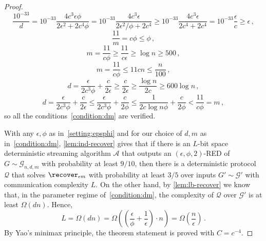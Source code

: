 \begin{proof}
\begin{equation*}
	\frac{10^{-33}}{d} = 10^{-33}\frac{4c^3\epsilon\phi}{2\epsilon^2 + 2c^4\phi}=10^{-33}\frac{4c^3\epsilon}{2\epsilon^2/\phi + 2c^4} \ge 10^{-33}\frac{4c^3\epsilon}{2c^4 + 2c^4} = 10^{-33} \frac{\epsilon}{c} \ge \epsilon \, ,
\end{equation*}
\begin{equation*}
	\frac{11}{m} = c{\phi} \le \phi \, ,
\end{equation*}
\begin{equation*}
	m = \frac{11}{c \phi} \ge \frac{11}{c \epsilon}  \ge \log n \ge 500 \, ,
\end{equation*}
\begin{equation*}
	m = \frac{11}{c \phi} \le 11 c n \le \frac{n}{100}\, ,
\end{equation*}
\begin{equation*}
	d = \frac{\epsilon}{2c^3 \phi } + \frac{c}{2 \epsilon} \ge \frac{c}{2 \epsilon}  \ge \frac{\log n}{2c} \ge 600 \log n \, ,
\end{equation*}
\begin{equation*}
	d = \frac{\epsilon}{2c^3 \phi } + \frac{c}{2 \epsilon} \le \frac{\epsilon}{2c^3 \phi } + \frac{c}{2 \phi}  \le \frac{1}{2c \log n \phi } + \frac{c}{2 \phi}  < \frac{11}{c \phi} = m \, ,
\end{equation*}
so all the conditions~\eqref{condition:dm} are verified.
	
	With any $\epsilon,\phi$ as in~\eqref{setting:epsphi} and for our choice of $d,m$ as in~\eqref{condition:dm}, \cref{lem:ind-recover} gives that if there is an $L$-bit space deterministic streaming algorithm $\mathcal{A}$ that outputs an $(\epsilon,\phi,2)$-RED of $G \sim \mathcal{G}_{n,d,m}$ with probability at least $9/10$, then there is a deterministic protocol $\mathcal{Q}$ that solves $\recover_{\epsilon m}$ with probability at least $3/5$ over inputs $G' \sim \mathcal{G}'$ with communication complexity $L$. On the other hand, by \cref{lem:lb-recover} we know that, in the parameter regime of~\eqref{condition:dm}, the complexity of $\mathcal{Q}$ over $ \mathcal{G}'$ is at least $\Omega(dn)$. Hence,
	\begin{equation*}
		L = \Omega(dn)  = \Omega\left(\left(\frac{\epsilon}{\phi}+\frac{1}{\epsilon}\right) \cdot n \right) = \Omega\left(\frac{n}{\epsilon}\right)\, .
	\end{equation*}
 	By Yao's minimax principle, the theorem statement is proved with $C = c^{-4}$.
	
\end{proof}